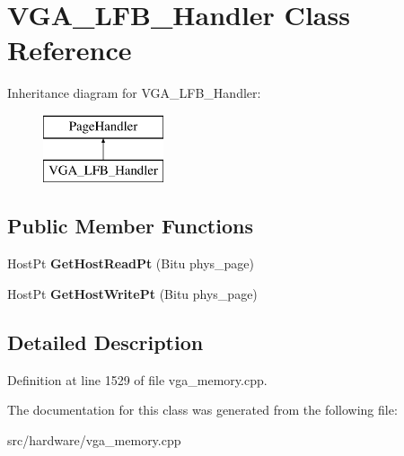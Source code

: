 \hypertarget{classVGA__LFB__Handler}{\section{V\-G\-A\-\_\-\-L\-F\-B\-\_\-\-Handler Class Reference}
\label{classVGA__LFB__Handler}
}
Inheritance diagram for V\-G\-A\-\_\-\-L\-F\-B\-\_\-\-Handler\-:\begin{figure}[H]
\begin{center}
\leavevmode
\includegraphics[height=2.000000cm]{classVGA__LFB__Handler}
\end{center}
\end{figure}
\subsection*{Public Member Functions}
\begin{DoxyCompactItemize}
\item 
\hypertarget{classVGA__LFB__Handler_ad4cf94e4a3b186e307f54fc0ca5f8a33}{Host\-Pt {\bfseries Get\-Host\-Read\-Pt} (Bitu phys\-\_\-page)}\label{classVGA__LFB__Handler_ad4cf94e4a3b186e307f54fc0ca5f8a33}

\item 
\hypertarget{classVGA__LFB__Handler_abc42ff47ee5307b3de27bed8594a1354}{Host\-Pt {\bfseries Get\-Host\-Write\-Pt} (Bitu phys\-\_\-page)}\label{classVGA__LFB__Handler_abc42ff47ee5307b3de27bed8594a1354}

\end{DoxyCompactItemize}


\subsection{Detailed Description}


Definition at line 1529 of file vga\-\_\-memory.\-cpp.



The documentation for this class was generated from the following file\-:\begin{DoxyCompactItemize}
\item 
src/hardware/vga\-\_\-memory.\-cpp\end{DoxyCompactItemize}
